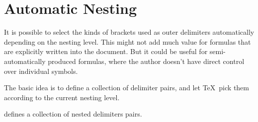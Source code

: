 \documentclass{longmath-doc}
\begin{document}
\section{Automatic Nesting}

It is possible to select the kinds of brackets used as outer delimiters automatically depending on the nesting level. This might not add much value for formulas that are explicitly written into the document. But it could be useful for semi-automatically produced formulas, where the author doesn't have direct control over individual symbols.  

The basic idea is to define a collection of delimiter pairs, and let \TeX\ pick them according to the current nesting level.

 defines a collection of nested delimiters pairs. 
\end{document}
